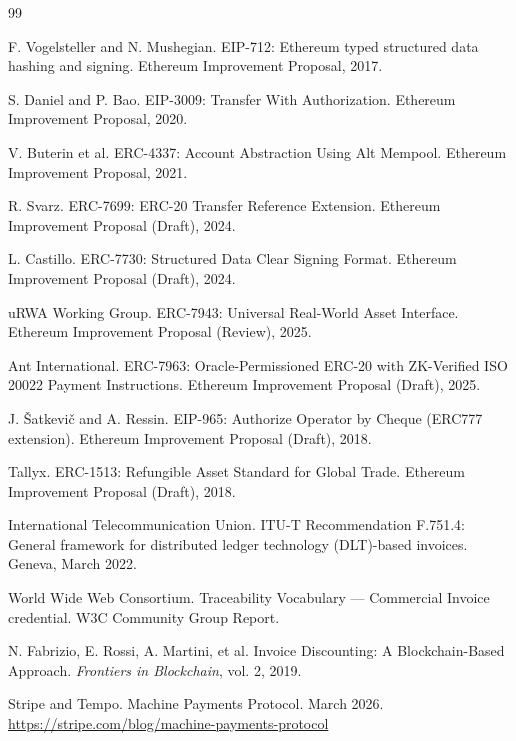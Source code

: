 \documentclass[11pt,a4paper]{article}
\begin{document}

\begin{thebibliography}{99}

F. Vogelsteller and N. Mushegian.
\newblock EIP-712: Ethereum typed structured data hashing and signing.
\newblock Ethereum Improvement Proposal, 2017.

S. Daniel and P. Bao.
\newblock EIP-3009: Transfer With Authorization.
\newblock Ethereum Improvement Proposal, 2020.

V. Buterin et al.
\newblock ERC-4337: Account Abstraction Using Alt Mempool.
\newblock Ethereum Improvement Proposal, 2021.

R. Svarz.
\newblock ERC-7699: ERC-20 Transfer Reference Extension.
\newblock Ethereum Improvement Proposal (Draft), 2024.

L. Castillo.
\newblock ERC-7730: Structured Data Clear Signing Format.
\newblock Ethereum Improvement Proposal (Draft), 2024.

uRWA Working Group.
\newblock ERC-7943: Universal Real-World Asset Interface.
\newblock Ethereum Improvement Proposal (Review), 2025.

Ant International.
\newblock ERC-7963: Oracle-Permissioned ERC-20 with ZK-Verified ISO 20022 Payment Instructions.
\newblock Ethereum Improvement Proposal (Draft), 2025.

J. Šatkevič and A. Ressin.
\newblock EIP-965: Authorize Operator by Cheque (ERC777 extension).
\newblock Ethereum Improvement Proposal (Draft), 2018.

Tallyx.
\newblock ERC-1513: Refungible Asset Standard for Global Trade.
\newblock Ethereum Improvement Proposal (Draft), 2018.

International Telecommunication Union.
\newblock ITU-T Recommendation F.751.4: General framework for distributed ledger technology (DLT)-based invoices.
\newblock Geneva, March 2022.

World Wide Web Consortium.
\newblock Traceability Vocabulary --- Commercial Invoice credential.
\newblock W3C Community Group Report.

N. Fabrizio, E. Rossi, A. Martini, et al.
\newblock Invoice Discounting: A Blockchain-Based Approach.
\newblock \emph{Frontiers in Blockchain}, vol. 2, 2019.

Stripe and Tempo.
\newblock Machine Payments Protocol.
\newblock March 2026.
\newblock \url{https://stripe.com/blog/machine-payments-protocol}


\end{thebibliography}
\end{document}
